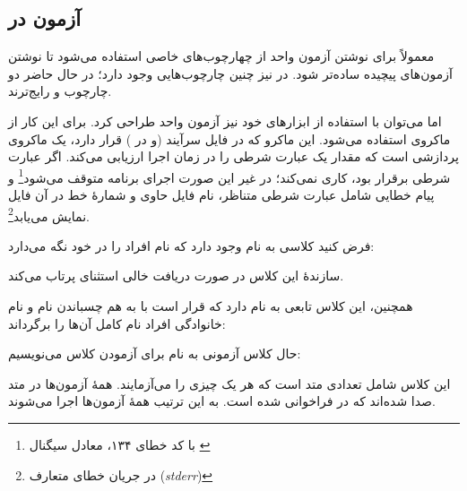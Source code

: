 \documentclass{utap}
\begin{document}
    \subsection{آزمون در }

    معمولاً برای نوشتن آزمون واحد از چهارچوب‌های خاصی استفاده می‌شود تا نوشتن آزمون‌های پیچیده ساده‌تر شود. در  نیز چنین چارچوب‌هایی وجود دارد؛ در حال حاضر دو چارچوب  و  رایج‌ترند.

    اما می‌توان با استفاده از ابزارهای خود  نیز آزمون واحد طراحی کرد. برای این کار از ماکروی  استفاده می‌شود. این ماکرو که در فایل سرآیند  (و  در ) قرار دارد، یک ماکروی پردازشی است که مقدار یک عبارت شرطی را در زمان اجرا ارزیابی می‌کند. اگر عبارت شرطی برقرار بود،  کاری نمی‌کند؛ در غیر این صورت اجرای برنامه متوقف می‌شود\footnote{با کد خطای ۱۳۴، معادل سیگنال \textit{}} و پیام خطایی شامل عبارت شرطی متناظر، نام فایل حاوی  و شمارهٔ خط  در آن فایل نمایش می‌یابد\footnote{در جریان خطای متعارف (\textit{stderr})}.

    فرض کنید کلاسی به نام  وجود دارد که نام افراد را در خود نگه می‌دارد:
    \begin{latin}\end{latin}

    سازندهٔ این کلاس در صورت دریافت  خالی استثنای  پرتاب می‌کند.

    همچنین، این کلاس تابعی به نام  دارد که قرار است با به هم چسباندن نام و نام خانوادگی افراد نام کامل آن‌ها را برگرداند:
    \begin{latin}\end{latin}

    حال کلاس آزمونی به نام  برای آزمودن کلاس  می‌نویسیم:
    \begin{latin}\end{latin}

    این کلاس شامل تعدادی متد است که هر یک چیزی را می‌آزمایند. همهٔ آزمون‌ها در متد  صدا شده‌اند که در  فراخوانی شده است. به این ترتیب همهٔ آزمون‌ها اجرا می‌شوند.
\end{document}
